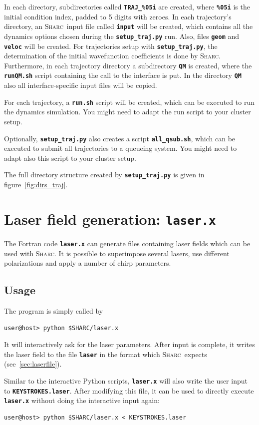 \documentclass[a4paper,11pt,DIV=15,openany,twoside=false]{scrbook}
\newcommand{\sharc}{\textsc{Sharc}}
\newcommand{\ttt}[1]{\textbf{\texttt{#1}}}
\begin{document}
In each directory, subdirectories called \ttt{TRAJ\_\%05i} are created, where \ttt{\%05i} is the initial condition index, padded to 5 digits with zeroes. In each trajectory's directory, an \sharc\ input file called \ttt{input} will be created, which contains all the dynamics options chosen during the \ttt{setup\_traj.py} run. Also, files \ttt{geom} and \ttt{veloc} will be created. For trajectories setup with \ttt{setup\_traj.py}, the determination of the initial wavefunction coefficients is done by \sharc.
Furthermore, in each trajectory directory a subdirectory \ttt{QM} is created, where the \ttt{runQM.sh} script containing the call to the interface is put. In the directory \ttt{QM} also all interface-specific input files will be copied.

For each trajectory, a \ttt{run.sh} script will be created, which can be executed to run the dynamics simulation. You might need to adapt the run script to your cluster setup.

Optionally, \ttt{setup\_traj.py} also creates a script \ttt{all\_qsub.sh}, which can be executed to submit all trajectories to a queueing system. You might need to adapt also this script to your cluster setup.

The full directory structure created by \ttt{setup\_traj.py} is given in figure~\ref{fig:dirs_traj}.



\section{Laser field generation: \ttt{laser.x}}\label{sec:laser.x}

The Fortran code \ttt{laser.x} can generate files containing laser fields which can be used with \sharc. It is possible to superimpose several lasers, use different polarizations and apply a number of chirp parameters.

\subsection{Usage}

The program is simply called by 
\begin{verbatim}
user@host> python $SHARC/laser.x
\end{verbatim}
It will interactively ask for the laser parameters. After input is complete, it writes the laser field to the file \ttt{laser} in the format which \sharc\ expects (see~\ref{sec:laserfile}).

Similar to the interactive Python scripts, \ttt{laser.x} will also write the user input to \ttt{KEYSTROKES.laser}. After modifying this file, it can be used to directly execute \ttt{laser.x} without doing the interactive input again:
\begin{verbatim}
user@host> python $SHARC/laser.x < KEYSTROKES.laser
\end{verbatim}
\end{document}
